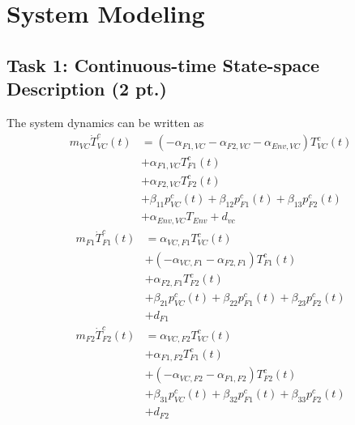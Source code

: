 \documentclass[a4paper,twoside,11pt]{article}
\numberwithin{equation}{section}
\begin{document}


\tableofcontents

\newpage

\section{System Modeling}

\subsection{Task 1: Continuous-time State-space Description (2 pt.)} 
 
The system dynamics can be written as
\begin{equation}
\begin{split}
    m_{VC}\dot{T}^c_{VC}(t) & = (-\alpha_{F1,VC}-\alpha_{F2,VC}-\alpha_{Env,VC})T^c_{VC}(t) \\ 
                            & + \alpha_{F1,VC}T^c_{F1}(t) \\
                            & + \alpha_{F2,VC}T^c_{F2}(t) \\
                            & + \beta_{11}p^c_{VC}(t) + \beta_{12}p^c_{F1}(t) + \beta_{13}p^c_{F2}(t) \\
                            & + \alpha_{Env,VC}T_{Env} + d_{vc}
\end{split}
\end{equation}
\begin{equation}
\begin{split}
    m_{F1}\dot{T}^c_{F1}(t) & = \alpha_{VC,F1}T^c_{VC}(t) \\
                            & + (-\alpha_{VC,F1}-\alpha_{F2,F1})T^c_{F1}(t) \\
                            & + \alpha_{F2,F1}T^c_{F2}(t) \\
                            & + \beta_{21}p^c_{VC}(t) + \beta_{22}p^c_{F1}(t) + \beta_{23}p^c_{F2}(t) \\
                            & + d_{F1}
\end{split}
\end{equation}
\begin{equation}
\begin{split}
    m_{F2}\dot{T}^c_{F2}(t) & = \alpha_{VC,F2}T^c_{VC}(t) \\
                            & + \alpha_{F1,F2}T^c_{F1}(t) \\
                            & + (-\alpha_{VC,F2}-\alpha_{F1,F2})T^c_{F2}(t) \\
                            & + \beta_{31}p^c_{VC}(t) + \beta_{32}p^c_{F1}(t) + \beta_{33}p^c_{F2}(t) \\
                            & + d_{F2}
\end{split}
\end{equation}
\end{document}
